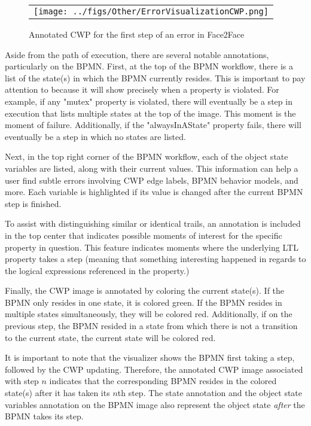 \begin{figure*}[t]
  \begin{center}
    \begin{tabular}{c}
        \texttt{[image: ../figs/Other/ErrorVisualizationCWP.png]}
    \end{tabular}
  \end{center}
\caption{Annotated CWP for the first step of an error in Face2Face}
\label{fig:ErrorVisualizationCWP}
\end{figure*}

Aside from the path of execution, there are several notable annotations, particularly on the BPMN. First, at the top of the BPMN workflow, there is a list of the state(s) in which the BPMN currently resides. This is important to pay attention to because it will show precisely when a property is violated. For example, if any "mutex" property is violated, there will eventually be a step in execution that lists multiple states at the top of the image. This moment is the moment of failure. Additionally, if the "alwaysInAState" property fails, there will eventually be a step in which no states are listed.

Next, in the top right corner of the BPMN workflow, each of the object state variables are listed, along with their current values. This information can help a user find subtle errors involving CWP edge labels, BPMN behavior models, and more. Each variable is highlighted if its value is changed after the current BPMN step is finished.

To assist with distinguishing similar or identical trails, an annotation is included in the top center that indicates possible moments of interest for the specific property in question. This feature indicates moments where the underlying LTL property takes a step (meaning that something interesting happened in regards to the logical expressions referenced in the property.)

Finally, the CWP image is annotated by coloring the current state(s). If the BPMN only resides in one state, it is colored green. If the BPMN resides in multiple states simultaneously, they will be colored red. Additionally, if on the previous step, the BPMN resided in a state from which there is not a transition to the current state, the current state will be colored red.

It is important to note that the visualizer shows the BPMN first taking a step, followed by the CWP updating. Therefore, the annotated CWP image associated with step $n$ indicates that the corresponding BPMN resides in the colored state(s) after it has taken its $n$th step. The state annotation and the object state variables annotation on the BPMN image also represent the object state \emph{after} the BPMN takes its step.

